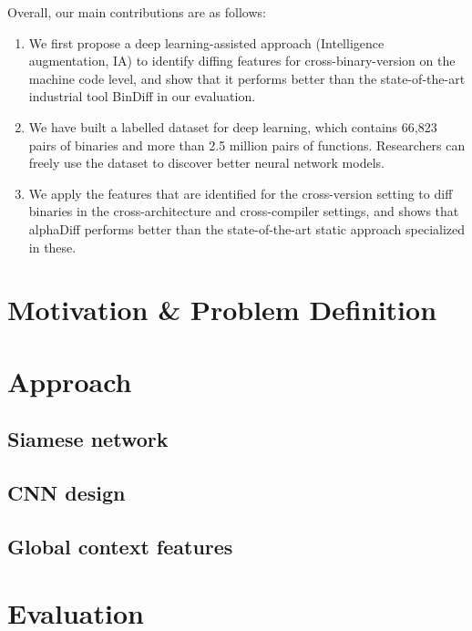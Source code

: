 \documentclass[10pt,conference]{IEEEtran}
\begin{document}
Overall, our main contributions are as follows:
\begin{enumerate}
\item We first propose a deep learning-assisted approach (Intelligence augmentation, IA) to identify diffing features for cross-binary-version on the machine code level, 
and show that it performs better than the state-of-the-art industrial tool BinDiff in our evaluation.

\item We have built a labelled dataset for deep learning, which contains 66,823 pairs of binaries and more than 2.5 million pairs of functions. 
Researchers can freely use the dataset to discover better neural network models.

\item We apply the features that are identified for the cross-version setting to diff binaries in the cross-architecture and cross-compiler settings, 
and shows that alphaDiff performs better than the state-of-the-art static approach specialized in these.
\end{enumerate}

\section{Motivation \& Problem Definition}

\section{Approach}

\subsection{Siamese network}

\subsection{CNN design}

\subsection{Global context features}

\section{Evaluation}
\end{document}
